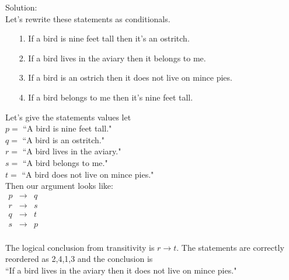 \documentclass[10 pt]{amsart}
\theoremstyle{definition}
\theoremstyle{remark}
\numberwithin{equation}{subsection}
\begin{document}
Solution:\\

Let's rewrite these statements as conditionals.
\begin{enumerate}
\item[1.] If a bird is nine feet tall then it's an ostritch.\\
\item[2.] If a bird lives in the aviary then it belongs to me.\\
\item[3.] If a bird is an ostrich then it does not live on mince pies.\\
\item[4.] If a bird belongs to me then it's nine feet tall.\\
\end{enumerate}

Let's give the statements values let\\
$p =$ ``A bird is nine feet tall."\\
$q =$ ``A bird is an ostritch."\\
$r =$ ``A bird lives in the aviary."\\
$s =$ ``A bird belongs to me."\\
$t =$ ``A bird does not live on mince pies."\\

Then our argument looks like:\\
$\begin{array}{rcl}
p & \rightarrow & q\\
r & \rightarrow & s\\
q & \rightarrow & t\\
s & \rightarrow & p\\
\end{array}$


The logical conclusion from transitivity is $r\rightarrow t$.  The statements are correctly reordered as 2,4,1,3 and the conclusion is\\

``If a bird lives in the aviary then it does not live on mince pies."
\end{document}
